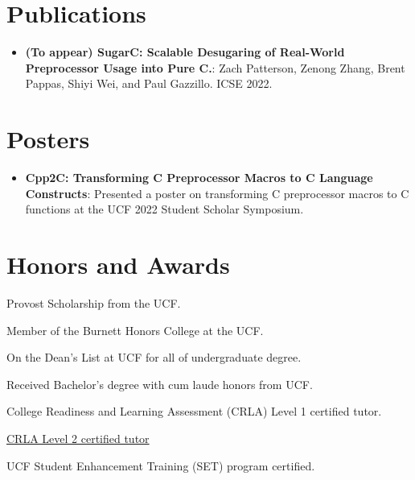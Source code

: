 \documentclass[a4paper,20pt]{article}
\newcommand{\resumeItem}[2]{
  \item\small{
    \textbf{#1}{: #2 \vspace{-2pt}}
  }
}
\newcommand{\resumeSubItem}[2]{\resumeItem{#1}{#2}\vspace{-3pt}}
\newcommand{\resumeSubHeadingListStart}{\begin{itemize}[leftmargin=*]}
\newcommand{\resumeSubHeadingListEnd}{\end{itemize}}
\begin{document}
\vspace{-5pt}
\section{Publications}
\resumeSubHeadingListStart
\resumeSubItem
{(To appear) SugarC: Scalable Desugaring of Real-World Preprocessor Usage into Pure C.}
{Zach Patterson, Zenong Zhang, Brent Pappas, Shiyi Wei, and Paul Gazzillo. ICSE 2022.}
\resumeSubHeadingListEnd

\vspace{-5pt}
\section{Posters}
\resumeSubHeadingListStart
\resumeSubItem
{Cpp2C: Transforming C Preprocessor Macros to C Language Constructs}
{Presented a poster on transforming C preprocessor macros to C functions at the UCF 2022 Student Scholar Symposium.}
\resumeSubHeadingListEnd

\vspace{-5pt}
\section{Honors and Awards}
\begin{description}[font=$\bullet$]
    \item {Provost Scholarship from the UCF.}
          \vspace{-5pt}
    \item {Member of the Burnett Honors College at the UCF.}
          \vspace{-5pt}
    \item {On the Dean's List at UCF for all of undergraduate degree.}
          \vspace{-5pt}
    \item {Received Bachelor's degree with cum laude honors from UCF.}
          \vspace{-5pt}
    \item {College Readiness and Learning Assessment (CRLA) Level 1 certified tutor.}
          \vspace{-5pt}
    \item {\href{https://drive.google.com/file/d/1idZ5hhQQF4f-ZRQCBUplQTGU9YjS7fUs/view?usp=sharing}{CRLA Level 2 certified tutor}}
          \vspace{-5pt}
    \item {UCF Student Enhancement Training (SET) program certified.}

\end{description}
\end{document}

